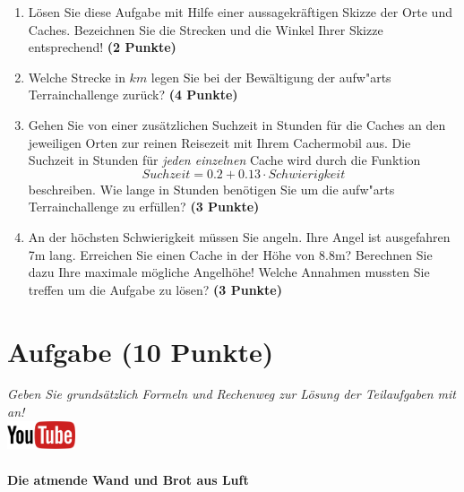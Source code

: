 \documentclass[a4paper, 10pt]{scrartcl}\usepackage[]{graphicx}\usepackage[]{xcolor}
\begin{document}
\begin{enumerate}
\item L{\"o}sen Sie diese Aufgabe mit Hilfe einer aussagekr{\"a}ftigen Skizze der
  Orte und Caches. Bezeichnen Sie die Strecken und die Winkel Ihrer Skizze
  entsprechend! \textbf{(2 Punkte)}
\item Welche Strecke in $km$ legen Sie bei der Bew{\"a}ltigung der
  aufw{"a}rts Terrainchallenge zur{\"u}ck? \textbf{(4
    Punkte)}
\item Gehen Sie von einer zus{\"a}tzlichen Suchzeit in Stunden f{\"u}r die
  Caches an den jeweiligen Orten zur reinen Reisezeit mit Ihrem Cachermobil
  aus. Die Suchzeit in Stunden f{\"u}r \textit{jeden einzelnen} Cache wird durch die
  Funktion
  \begin{equation*}
    Suchzeit = 0.2 + 0.13 \cdot Schwierigkeit
  \end{equation*}  
  beschreiben.  Wie lange in Stunden ben{\"o}tigen Sie um die
  aufw{"a}rts Terrainchallenge zu erf{\"u}llen? \textbf{(3 Punkte)}
\item An der h{\"o}chsten Schwierigkeit m{\"u}ssen Sie angeln. Ihre Angel ist
  ausgefahren 7m lang. Erreichen Sie einen Cache in der H{\"o}he
  von 8.8m?  Berechnen Sie dazu Ihre maximale m{\"o}gliche
  Angelh{\"o}he! Welche Annahmen mussten Sie treffen um die Aufgabe zu l{\"o}sen? \textbf{(3 Punkte)} 
\end{enumerate}

 
\clearpage

\section{Aufgabe \hfill (10 Punkte)}

\textit{Geben Sie grunds{\"a}tzlich Formeln und Rechenweg zur L{\"o}sung der
  Teilaufgaben mit an!} \\[1Ex]

\hfill\href{https://youtu.be/4-dSaPMhK9s}{\includegraphics[width =
  2cm]{img/youtube}} %
\hspace{2Ex}

\paragraph{Die atmende Wand und Brot aus Luft}
\end{document}
